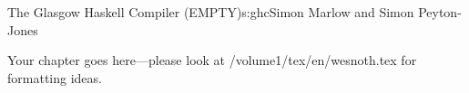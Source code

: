 \begin{aosachapter}{The Glasgow Haskell Compiler (EMPTY)}{s:ghc}{Simon Marlow and Simon Peyton-Jones}

Your chapter goes here---please look at /volume1/tex/en/wesnoth.tex for 
formatting ideas.

\end{aosachapter}
